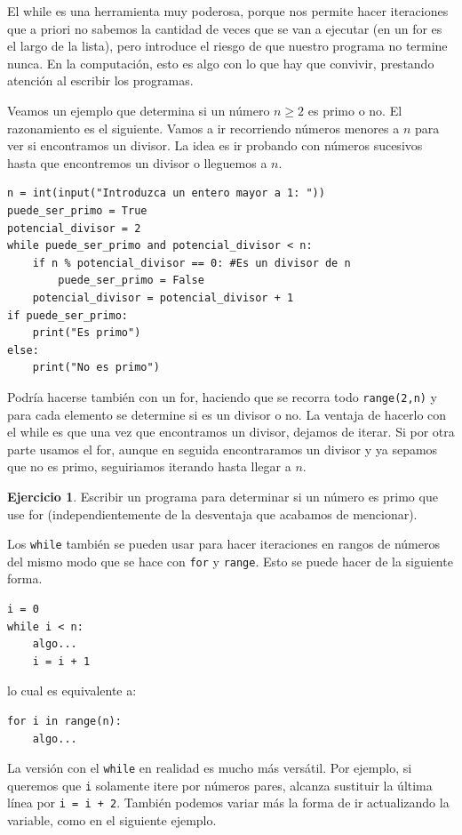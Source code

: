 \documentclass[a4paper, 12pt]{report}
\theoremstyle{definition}
\newtheorem{ejercicio}{Ejercicio}[section]
\begin{document}
El while es una herramienta muy poderosa, porque nos permite hacer iteraciones que a priori no sabemos la cantidad de veces que se van a ejecutar (en un for es el largo de la lista), pero introduce el riesgo de que nuestro programa no termine nunca. En la computación, esto es algo con lo que hay que convivir, prestando atención al escribir los programas.

Veamos un ejemplo que determina si un número $n\geq 2$ es primo o no. El razonamiento es el siguiente. Vamos a ir recorriendo números menores a $n$ para ver si encontramos un divisor. La idea es ir probando con números sucesivos hasta que encontremos un divisor o lleguemos a $n$.
\begin{verbatim}
n = int(input("Introduzca un entero mayor a 1: "))
puede_ser_primo = True
potencial_divisor = 2
while puede_ser_primo and potencial_divisor < n:
    if n % potencial_divisor == 0: #Es un divisor de n
        puede_ser_primo = False
    potencial_divisor = potencial_divisor + 1
if puede_ser_primo:
    print("Es primo")
else:
    print("No es primo")
\end{verbatim}
Podría hacerse también con un for, haciendo que se recorra todo {\tt range(2,n)} y para cada elemento se determine si es un divisor o no. La ventaja de hacerlo con el while es que una vez que encontramos un divisor, dejamos de iterar. Si por otra parte usamos el for, aunque en seguida encontraramos un divisor y ya sepamos que no es primo, seguiriamos iterando hasta llegar a $n$.

\begin{ejercicio}
	Escribir un programa para determinar si un número es primo que use for (independientemente de la desventaja que acabamos de mencionar).
\end{ejercicio}

Los {\tt while} también se pueden usar para hacer iteraciones en rangos de números del mismo modo que se hace con {\tt for} y {\tt range}. Esto se puede hacer de la siguiente forma.
\begin{verbatim}
i = 0
while i < n:
    algo...
    i = i + 1
\end{verbatim}
lo cual es equivalente a:
\begin{verbatim}
for i in range(n):
    algo...
\end{verbatim}
La versión con el {\tt while} en realidad es mucho más versátil. Por ejemplo, si queremos que {\tt i} solamente itere por números pares, alcanza sustituir la última línea por {\tt i = i + 2}. También podemos variar más la forma de ir actualizando la variable, como en el siguiente ejemplo.
\end{document}
